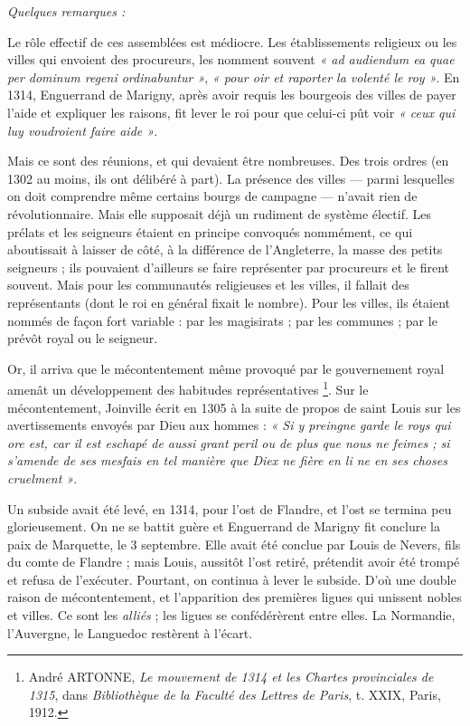 \documentclass[french,twoside]{book} %
\newlength{\listmod}
\newcommand{\listhead}[1]{\hspace{-1\listmod}\emph{#1}}
\newcommand{\labelchar}[1]{{\color{rubric}\bf #1}}
\begin{document}
\begin{listalpha}[itemsep=0pt,]
\item[]\listhead{Quelques remarques :}
\item Le rôle effectif de ces assemblées est médiocre. Les établissements religieux ou les villes qui envoient des procureurs, les nomment souvent \emph{« ad audiendum ea quae per dominum regeni ordinabuntur »}, \emph{« pour oir et raporter la volenté le roy »}. En 1314, Enguerrand de Marigny, après avoir requis les bourgeois des villes de payer l’aide et expliquer les raisons, fit lever le roi pour que celui-ci pût voir \emph{« ceux qui luy voudroient faire aide »}.
\item Mais ce sont des réunions, et qui devaient être nombreuses. Des trois ordres (en 1302 au moins, ils ont délibéré à part). La présence des villes — parmi lesquelles on doit comprendre même certains bourgs de campagne — n’avait rien de révolutionnaire. Mais elle supposait déjà un rudiment de système électif. Les prélats et les seigneurs étaient en principe convoqués nommément, ce qui aboutissait à laisser de côté, à la différence de l’Angleterre, la masse des petits seigneurs ; ils pouvaient d’ailleurs se faire représenter par procureurs et le firent souvent. Mais pour les communautés religieuses et les villes, il fallait des représentants (dont le roi en général fixait le nombre). Pour les villes, ils étaient nommés de façon fort variable : par les magisirats ; par les communes ; par le prévôt royal ou le seigneur.

\end{listalpha}\bigbreak
\noindent \labelchar{4)} Or, il arriva que le mécontentement même provoqué par le gouvernement royal amenât un développement des habitudes représentatives \footnote{ André ARTONNE, {\itshape Le mouvement de 1314 et les Chartes provinciales de 1315}, dans {\itshape Bibliothèque de la Faculté des Lettres de Paris}, t. XXIX, Paris, 1912.}. Sur le mécontentement, Joinville écrit en 1305 à la suite de propos de saint Louis sur les avertissements envoyés par Dieu aux hommes : \emph{« Si y preingne garde le roys qui ore est, car il est eschapé de aussi grant peril ou de plus que nous ne feimes ; si s’amende de ses mesfais en tel manière que Diex ne fière en li ne en ses choses cruelment »}.\par
Un subside avait été levé, en 1314, pour l’ost de Flandre, et l’ost se termina peu glorieusement. On ne se battit guère et Enguerrand de Marigny fit conclure la paix de Marquette, le 3 septembre. Elle avait été conclue par Louis de Nevers, fils du comte de Flandre ; mais Louis, aussitôt l’ost retiré, prétendit avoir été trompé et refusa de l’exécuter. Pourtant, on continua à lever le subside. D’où une double raison de mécontentement, et l’apparition des premières ligues qui unissent nobles et villes. Ce sont les \emph{alliés} ; les ligues se confédérèrent entre elles. La Normandie, l’Auvergne, le Languedoc restèrent à l’écart.\par
\end{document}
